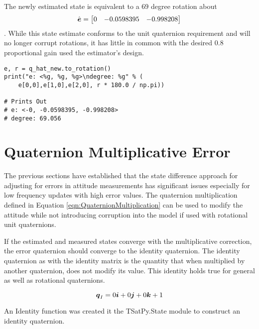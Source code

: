 The newly estimated state is equivalent to a $69$ degree rotation about
\begin{equation}\hat{\boldsymbol{e}} = \begin{bmatrix} 0 & -0.0598395 & -0.998208 \end{bmatrix}\end{equation}.  While this state estimate conforms to the unit quaternion requirement and will no longer corrupt rotations, it has little in common with the desired $0.8$ proportional gain used the estimator's design.

\begin{singlespace}
  \begin{verbatim}
e, r = q_hat_new.to_rotation()
print("e: <%g, %g, %g>\ndegree: %g" % (
    e[0,0],e[1,0],e[2,0], r * 180.0 / np.pi))

# Prints Out
# e: <-0, -0.0598395, -0.998208>
# degree: 69.056
  \end{verbatim}
\nocite{minted}
\end{singlespace}


\section{Quaternion Multiplicative Error}
\label{sec:QuaternionMultiplicativeError}

The previous sections have established that the state difference approach for adjusting for errors in attitude measurements has significant issues especially for low frequency updates with high error values.  The quaternion multiplication defined in Equation \ref{eqn:QuaternionMultiplication} can be used to modify the attitude while not introducing corruption into the model if used with rotational unit quaternions.

If the estimated and measured states converge with the multiplicative correction, the error quaternion should converge to the identity quaternion.  The identity quaternion as with the identity matrix is the quantity that when multiplied by another quaternion, does not modify its value.  This identity holds true for general as well as rotational quaternions.

\begin{equation}
  \boldsymbol{q}_I = 0 \boldsymbol{i} + 0 \boldsymbol{j} + 0 \boldsymbol{k} + 1
\end{equation}

An Identity function was created it the TSatPy.State module to construct an identity quaternion.

